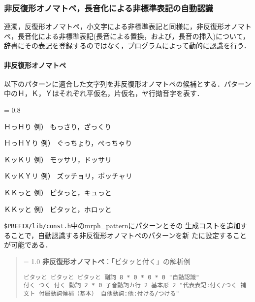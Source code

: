 \documentclass[a4j,titlepage]{jarticle}
\begin{document}
\subsubsection{非反復形オノマトペ，長音化による非標準表記の自動認識}

連濁，反復形オノマトペ，小文字による非標準表記と同様に，非反復形オノマト
ペ，長音化による非標準表記(長音による置換，および，長音の挿入)について，
辞書にその表記を登録するのではなく，プログラムによって動的に認識を行う．

\noindent
\paragraph{非反復形オノマトペ}
以下のパターンに適合した文字列を非反復形オノマトペの候補とする．パターン
中のＨ，Ｋ，Ｙはそれぞれ平仮名，片仮名，ヤ行拗音字を表す．

\begin{itemize}
{\baselineskip = 0.8 \baselineskip
 \item ＨっＨり   \hspace{2em}例） もっさり，ざっくり
 \item ＨっＨＹり \hspace{1em}例） ぐっちょり，ぺっちゃり
 \item ＫッＫリ   \hspace{2em}例） モッサリ，ドッサリ
 \item ＫッＫＹリ \hspace{1em}例） ズッチョリ，ポッチャリ
 \item ＫＫっと   \hspace{2em}例） ピタっと，キュっと
 \item ＫＫッと   \hspace{2em}例） ピタッと，ホロッと
}
\end{itemize}

\noindent \texttt{\$PREFIX/lib/const.h}中のmrph\_patternにパターンとその
生成コストを追加することで，自動認識する非反復形オノマトペのパターンを新
たに設定することが可能である．

\begin{quote}
{\baselineskip = 1.0 \baselineskip
{\bf 非反復形オノマトペ}：「ピタッと付く」の解析例\vspace{-2ex}
\begin{verbatim}
ピタッと ピタッと ピタッと 副詞 8 * 0 * 0 * 0 "自動認識"
付く つく 付く 動詞 2 * 0 子音動詞カ行 2 基本形 2 "代表表記:付く/つく 補文ト 付属動詞候補（基本） 自他動詞:他:付ける/つける"
\end{verbatim}
}
\end{quote}
\end{document}
